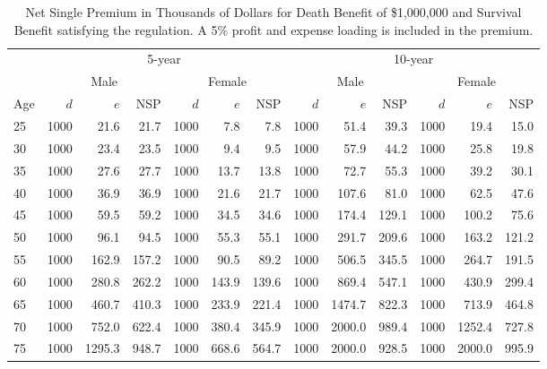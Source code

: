\begin{table}[ht]
\centering
\begingroup\small
\begin{tabular}{|l|rrrrrr|rrrrrr|}
  \hline
& \multicolumn{6}{c|}{5-year} & \multicolumn{6}{c|}{10-year} \\
 & \multicolumn{3}{c}{Male} & \multicolumn{3}{c|}{Female} & \multicolumn{3}{c}{Male} & \multicolumn{3}{c|}{Female} \\
 \hline
Age & $d$ & $e$ & NSP & $d$ & $e$ & NSP & $d$ & $e$ & NSP & $d$ & $e$ & NSP \\ 
  \hline
25 & 1000 & 21.6 & 21.7 & 1000 & 7.8 & 7.8 & 1000 & 51.4 & 39.3 & 1000 & 19.4 & 15.0 \\ 
  30 & 1000 & 23.4 & 23.5 & 1000 & 9.4 & 9.5 & 1000 & 57.9 & 44.2 & 1000 & 25.8 & 19.8 \\ 
  35 & 1000 & 27.6 & 27.7 & 1000 & 13.7 & 13.8 & 1000 & 72.7 & 55.3 & 1000 & 39.2 & 30.1 \\ 
  40 & 1000 & 36.9 & 36.9 & 1000 & 21.6 & 21.7 & 1000 & 107.6 & 81.0 & 1000 & 62.5 & 47.6 \\ 
  45 & 1000 & 59.5 & 59.2 & 1000 & 34.5 & 34.6 & 1000 & 174.4 & 129.1 & 1000 & 100.2 & 75.6 \\ 
  50 & 1000 & 96.1 & 94.5 & 1000 & 55.3 & 55.1 & 1000 & 291.7 & 209.6 & 1000 & 163.2 & 121.2 \\ 
  55 & 1000 & 162.9 & 157.2 & 1000 & 90.5 & 89.2 & 1000 & 506.5 & 345.5 & 1000 & 264.7 & 191.5 \\ 
  60 & 1000 & 280.8 & 262.2 & 1000 & 143.9 & 139.6 & 1000 & 869.4 & 547.1 & 1000 & 430.9 & 299.4 \\ 
  65 & 1000 & 460.7 & 410.3 & 1000 & 233.9 & 221.4 & 1000 & 1474.7 & 822.3 & 1000 & 713.9 & 464.8 \\ 
  70 & 1000 & 752.0 & 622.4 & 1000 & 380.4 & 345.9 & 1000 & 2000.0 & 989.4 & 1000 & 1252.4 & 727.8 \\ 
  75 & 1000 & 1295.3 & 948.7 & 1000 & 668.6 & 564.7 & 1000 & 2000.0 & 928.5 & 1000 & 2000.0 & 995.9 \\ 
   \hline
\end{tabular}
\endgroup
\caption{Net Single Premium in Thousands of Dollars for Death Benefit of \$1,000,000 and Survival Benefit satisfying the regulation. A 5\% profit and expense loading is included in the premium.} 
\label{tab:faceAmountTable}
\end{table}


